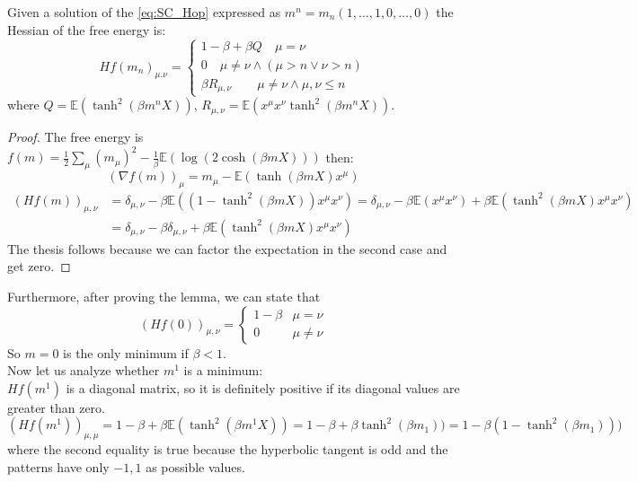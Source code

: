 \begin{lemma}
    Given a solution of the \cref{eq:SC_Hop} expressed as $ m^n= m_n(1,\ldots,1,0,\ldots,0)$ the Hessian of the free energy is:
    \[
       Hf(m_n)_{\mu.\nu}=\begin{cases}
           1- \beta + \beta Q   \quad  \mu = \nu \\
           0  \quad \mu \neq \nu \land (\mu > n \lor \nu >n)  \\
           \beta R_{\mu,\nu} \quad \quad \mu \neq \nu \land \mu,\nu \leq n
       \end{cases}
    \]
    where $Q = \mathbb{E}(\tanh^2(\beta m^n X))$, $R_{\mu,\nu} =  \mathbb{E}(x^\mu x^\nu \tanh^2(\beta m^n X)) $.
    \begin{proof}
        The free energy is $f(m) = \frac12 \sum_\mu  (m_\mu)^2 -\frac{1}{\beta} \mathbb{E}(\log(2 \cosh(\beta  m X ))) $ then:
        \[
        (\nabla f(m))_\mu = m_\mu - \mathbb{E}(\tanh(\beta  m X ) x^\mu  )
        \]
        \begin{align*}
             (Hf(m))_{\mu,\nu} &= \delta_{\mu,\nu}  -\beta \mathbb{E}((1 - \tanh^2(\beta  m X )) x^\mu x^\nu ) = \delta_{\mu,\nu}  - \beta\mathbb{E}( x^\mu x^\nu) +\beta \mathbb{E}(\tanh^2(\beta  m X )x^\mu x^\nu ) \\
             &=\delta_{\mu,\nu}  - \beta\delta_{\mu,\nu} +\beta \mathbb{E}(\tanh^2(\beta  m X )x^\mu x^\nu)
        \end{align*}
        The thesis follows because we can factor the expectation in the second case and get zero.
    \end{proof}
\end{lemma}
Furthermore, after proving the lemma, we can state that
\[
(Hf(0))_{\mu,\nu} = \begin{cases}
    1 - \beta &  \mu = \nu \\
    0 & \mu \neq \nu
\end{cases}
\]
So $m=0$ is the only minimum if $\beta < 1$.  \\
Now let us analyze whether $m^1$ is a minimum: \\
$Hf(m^1)$ is a diagonal matrix, so it is definitely positive if its diagonal values are greater than zero.\\
    \[
     (Hf(m^1))_{\mu,\mu} = 1- \beta + \beta  \mathbb{E}(\tanh^2(\beta m^1 X)) = 1- \beta + \beta \tanh^2(\beta m_1)) = 1 - \beta(1-  \tanh^2(\beta m_1))  )
    \]
where the second equality is true because the hyperbolic tangent is odd and the patterns have only $-1,1$ as possible values.

